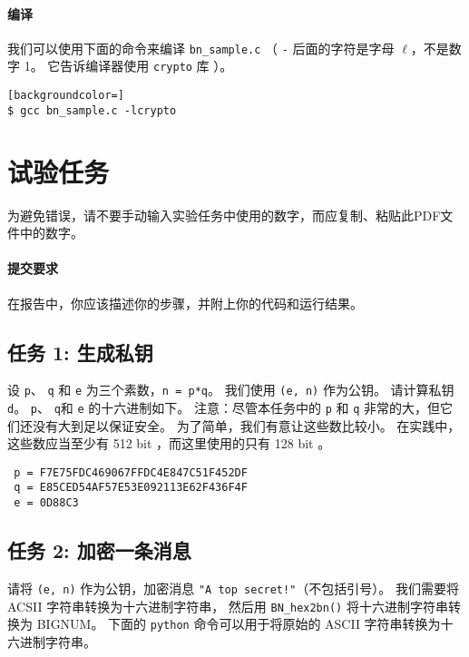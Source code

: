 \paragraph{编译}
我们可以使用下面的命令来编译 \texttt{bn\_sample.c}
（
\texttt{-} 后面的字符是字母 $\ell$，不是数字 1。
它告诉编译器使用 \texttt{crypto} 库
）。

\begin{lstlisting}[backgroundcolor=]
$ gcc bn_sample.c -lcrypto
\end{lstlisting}



\section{试验任务}


为避免错误，请不要手动输入实验任务中使用的数字，而应复制、粘贴此PDF文件中的数字。


\paragraph{提交要求}
在报告中，你应该描述你的步骤，并附上你的代码和运行结果。


\subsection{任务 1: 生成私钥}

设 \texttt{p}、 \texttt{q} 和 \texttt{e} 为三个素数，\texttt{n = p*q}。
我们使用 \texttt{(e, n)} 作为公钥。
请计算私钥 \texttt{d}。
\texttt{p}、 \texttt{q}和 \texttt{e} 的十六进制如下。
注意：尽管本任务中的 \texttt{p} 和 \texttt{q} 非常的大，但它们还没有大到足以保证安全。
为了简单，我们有意让这些数比较小。
在实践中，这些数应当至少有 512 bit ，而这里使用的只有 128 bit 。

\begin{lstlisting}
 p = F7E75FDC469067FFDC4E847C51F452DF
 q = E85CED54AF57E53E092113E62F436F4F
 e = 0D88C3
\end{lstlisting}


\subsection{任务 2: 加密一条消息}

请将 \texttt{(e, n)} 作为公钥，加密消息 \texttt{"A top secret!"}（不包括引号）。
我们需要将 ACSII 字符串转换为十六进制字符串，
然后用 \texttt{BN\_hex2bn()} 将十六进制字符串转换为 BIGNUM。
下面的 \texttt{python} 命令可以用于将原始的 ASCII 字符串转换为十六进制字符串。

